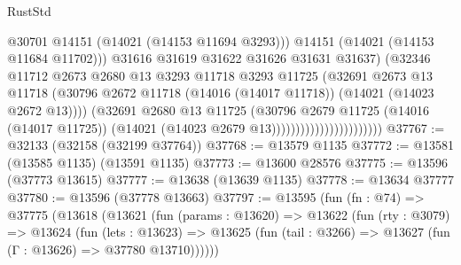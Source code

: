 \begin{lexlean}{RustStd}
\begin{coremodule}
                                              @30701
                                              @14151
                                              (@14021 (@14153 @11694 @3293)))
                                            @14151
                                            (@14021 (@14153 @11684 @11702)))
                                          @31616
                                          @31619
                                          @31622
                                          @31626
                                          @31631
                                          @31637)
                                        (@32346
                                          @11712
                                          @2673
                                          @2680
                                          @13
                                          @3293
                                          @11718
                                          @3293
                                          @11725
                                          (@32691
                                            @2673
                                            @13
                                            @11718
                                            (@30796
                                              @2672
                                              @11718
                                              (@14016 (@14017 @11718))
                                              (@14021 (@14023 @2672 @13))))
                                          (@32691
                                            @2680
                                            @13
                                            @11725
                                            (@30796
                                              @2679
                                              @11725
                                              (@14016 (@14017 @11725))
                                              (@14021 (@14023 @2679 @13)))))))))))))))))))))))
@37767 := @32133 (@32158 (@32199 @37764))
@37768 := @13579 @1135
@37772 := @13581 (@13585 @1135) (@13591 @1135)
@37773 := @13600 @28576
@37775 := @13596 (@37773 @13615)
@37777 := @13638 (@13639 @1135)
@37778 := @13634 @37777
@37780 := @13596 (@37778 @13663)
@37797 := @13595
    (fun (fn : @74) =>
    @37775
      (@13618
        (@13621
          (fun (params : @13620) =>
          @13622
            (fun (rty : @3079) =>
            @13624
              (fun (lets : @13623) =>
              @13625 (fun (tail : @3266) => @13627 (fun (Γ : @13626) => @37780 @13710))))))

\end{coremodule}
\end{lexlean}
